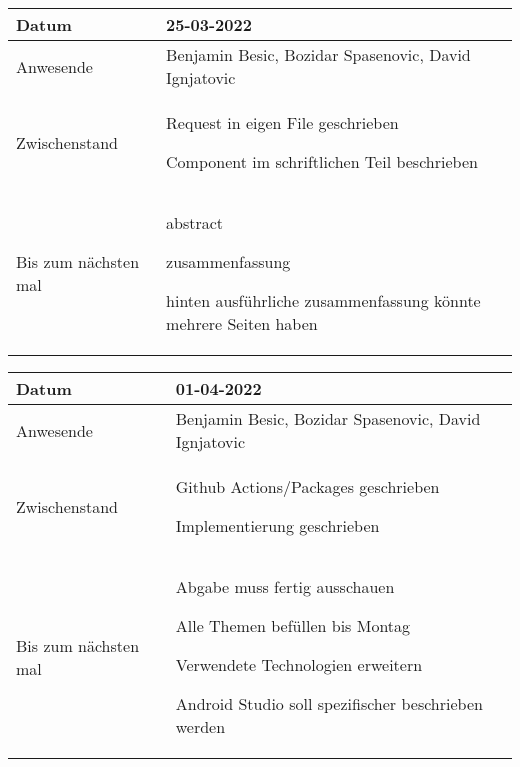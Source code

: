 \begin{center}
    \begin{tabular}{ |p{3cm}|p{10cm}|   }
        \hline
        Datum & 25-03-2022\\
        \hline
        Anwesende & Benjamin Besic, Bozidar Spasenovic, David Ignjatovic\\

        \hline
        Zwischenstand& 

        Request in eigen File geschrieben
    
        Component im schriftlichen Teil beschrieben
    
    \\
        \hline
        Bis zum nächsten mal & 

        abstract
    
        zusammenfassung
    
        hinten ausführliche zusammenfassung könnte mehrere Seiten haben
    
     \\
        \hline
    \end{tabular}
\end{center}
\begin{center}
    \begin{tabular}{ |p{3cm}|p{10cm}|   }
        \hline
        Datum & 01-04-2022\\
        \hline
        Anwesende & Benjamin Besic, Bozidar Spasenovic, David Ignjatovic\\

        \hline
        Zwischenstand& 

        Github Actions/Packages geschrieben
    
        Implementierung geschrieben
    
    \\
        \hline
        Bis zum nächsten mal &  

        Abgabe muss fertig ausschauen
    
        Alle Themen befüllen bis Montag
    
        Verwendete Technologien erweitern
    
        Android Studio soll spezifischer beschrieben werden
    
    \\
        \hline
    \end{tabular}
\end{center}